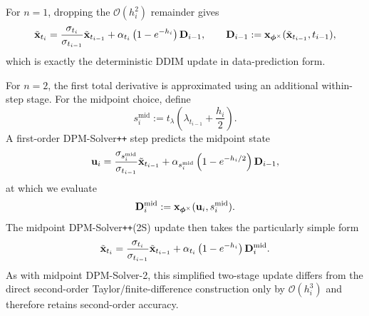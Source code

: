 For $n=1$, dropping the $\mathcal O(h_i^2)$ remainder gives
\[
\tilde{{\mathbf{x}}}_{t_i}
=
\frac{\sigma_{t_i}}{\sigma_{t_{i-1}}}
\tilde{{\mathbf{x}}}_{t_{i-1}}
+
\alpha_{t_i}
\left(
1-e^{-h_i}
\right)
{\mathbf{D}}_{i-1},
\qquad
{\mathbf{D}}_{i-1}
:=
{\mathbf{x}}_{\bm{\phi}^\times}
(\tilde{{\mathbf{x}}}_{t_{i-1}},t_{i-1}),
\]
which is exactly the deterministic DDIM update in data-prediction form.

For $n=2$, the first total derivative is approximated using an additional
within-step stage. For the midpoint choice, define
\[
s_i^{\mathrm{mid}}
:=
t_\lambda
\left(
\lambda_{t_{i-1}}+\frac{h_i}{2}
\right).
\]
A first-order DPM-Solver\texttt{++} step predicts the midpoint state
\[
{\mathbf{u}}_i
=
\frac{
\sigma_{s_i^{\mathrm{mid}}}
}{
\sigma_{t_{i-1}}
}
\tilde{{\mathbf{x}}}_{t_{i-1}}
+
\alpha_{s_i^{\mathrm{mid}}}
\left(
1-e^{-h_i/2}
\right)
{\mathbf{D}}_{i-1},
\]
at which we evaluate
\[
{\mathbf{D}}_i^{\mathrm{mid}}
:=
{\mathbf{x}}_{\bm{\phi}^\times}
({\mathbf{u}}_i,s_i^{\mathrm{mid}}).
\]
The midpoint DPM-Solver\texttt{++}(2S) update then takes the particularly
simple form
\[
\tilde{{\mathbf{x}}}_{t_i}
=
\frac{\sigma_{t_i}}{\sigma_{t_{i-1}}}
\tilde{{\mathbf{x}}}_{t_{i-1}}
+
\alpha_{t_i}
\left(
1-e^{-h_i}
\right)
{\mathbf{D}}_i^{\mathrm{mid}}.
\]
As with midpoint DPM-Solver-2, this simplified two-stage update differs from
the direct second-order Taylor/finite-difference construction only by
$\mathcal O(h_i^3)$ and therefore retains second-order accuracy.

